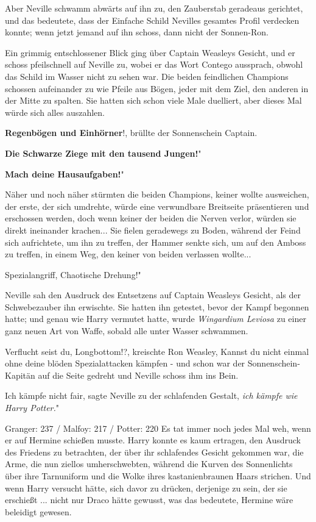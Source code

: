 Aber Neville schwamm abwärts auf ihn zu, den Zauberstab geradeaus gerichtet, und
das bedeutete, dass der Einfache Schild Nevilles gesamtes Profil verdecken
konnte; wenn jetzt jemand auf ihn schoss, dann nicht der Sonnen-Ron.

Ein grimmig entschlossener Blick ging über Captain Weasleys Gesicht, und er
schoss pfeilschnell auf Neville zu, wobei er das Wort Contego aussprach, obwohl
das Schild im Wasser nicht zu sehen war. Die beiden feindlichen Champions
schossen aufeinander zu wie Pfeile aus Bögen, jeder mit dem Ziel, den anderen in
der Mitte zu spalten. Sie hatten sich schon viele Male duelliert, aber dieses
Mal würde sich alles auszahlen.

\glqq \textbf{Regenbögen und Einhörner}!\grqq{}, brüllte der Sonnenschein
Captain.

\glqq \textbf{Die Schwarze Ziege mit den tausend Jungen!}"

\glqq \textbf{Mach deine Hausaufgaben!}"

Näher und noch näher stürmten die beiden Champions, keiner wollte ausweichen,
der erste, der sich umdrehte, würde eine verwundbare Breitseite präsentieren und
erschossen werden, doch wenn keiner der beiden die Nerven verlor, würden sie
direkt ineinander krachen... Sie fielen geradewegs zu Boden, während der Feind
sich aufrichtete, um ihn zu treffen, der Hammer senkte sich, um auf den Amboss
zu treffen, in einem Weg, den keiner von beiden verlassen wollte...

\glqq Spezialangriff, Chaotische Drehung!"

Neville sah den Ausdruck des Entsetzens auf Captain Weasleys Gesicht, als der
Schwebezauber ihn erwischte. Sie hatten ihn getestet, bevor der Kampf begonnen
hatte; und genau wie Harry vermutet hatte, wurde \emph{Wingardium Leviosa} zu
einer ganz neuen Art von Waffe, sobald alle unter Wasser schwammen.

\glqq Verflucht seist du, Longbottom!?\grqq{}, kreischte Ron Weasley, \glqq
Kannst du nicht einmal ohne deine blöden Spezialattacken kämpfen -\grqq{} und
schon war der Sonnenschein-Kapitän auf die Seite gedreht und Neville schoss ihm
ins Bein.

\glqq Ich kämpfe nicht fair\grqq{}, sagte Neville zu der schlafenden Gestalt,
\glqq \emph{ich kämpfe wie Harry Potter.}"


Granger: 237 / Malfoy: 217 / Potter: 220 Es tat immer noch jedes Mal weh, wenn
er auf Hermine schießen musste. Harry konnte es kaum ertragen, den Ausdruck des
Friedens zu betrachten, der über ihr schlafendes Gesicht gekommen war, die Arme,
die nun ziellos umherschwebten, während die Kurven des Sonnenlichts über ihre
Tarnuniform und die Wolke ihres kastanienbraunen Haars strichen. Und wenn Harry
versucht hätte, sich davor zu drücken, derjenige zu sein, der sie erschießt ...
nicht nur Draco hätte gewusst, was das bedeutete, Hermine wäre beleidigt
gewesen.

